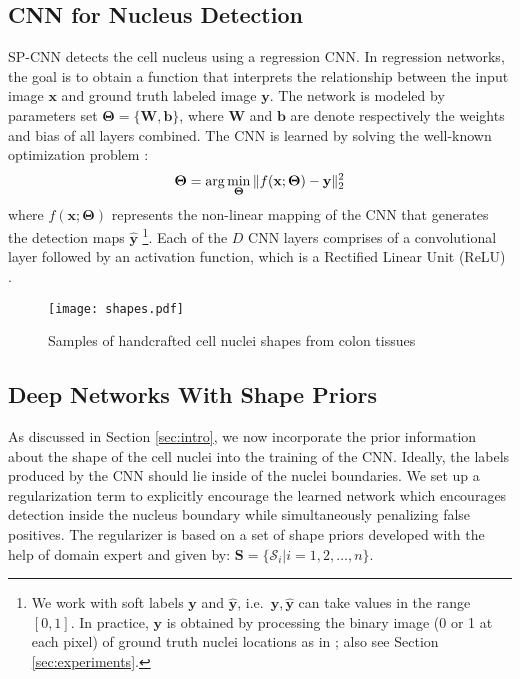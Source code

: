 \documentclass{article}
\begin{document}
\subsection{CNN for Nucleus Detection}\vspace{-3pt}
SP-CNN detects the cell nucleus using a regression CNN. In regression networks, the goal is to obtain a function that interprets the relationship between the input image $\mathbf{x}$ and ground truth labeled image $\mathbf{y}$. The network is modeled by parameters set $\mathbf{\Theta}=\{\mathbf{W}, \mathbf{b}\}$, where $\mathbf{W}$ and $\mathbf{b}$ are denote respectively the weights and bias of all layers combined. The CNN is learned by solving the well-known optimization problem \cite{SC_CNN,RegFuncRef1,RegFuncRef2}:\vspace{-2mm}
\begin{equation}
\mathbf{\Theta} = \arg\min\limits_{\mathbf{\Theta}}\|f(\mathbf{x}; \mathbf{\Theta}) - \mathbf{y}\|_2^2
\label{eq:CNN_func}\vspace{-2mm}
\end{equation}
where $f(\mathbf{x;\Theta})$ represents the non-linear mapping of the CNN that generates the detection maps $\mathbf{\hat{y}}$ \footnote{\noindent We work with soft labels $\mathbf{y}$ and $\mathbf{\hat{y}}$, i.e.\ $\mathbf{y}, \mathbf{\hat{y}}$ can take values in the range $[0,1]$. In practice, $\mathbf{y}$ is obtained by processing the binary image (0 or 1 at each pixel) of ground truth nuclei locations as in \cite{SC_CNN}; also see Section \ref{sec:experiments}.}. Each of the $D$ CNN layers comprises of a convolutional layer followed by an activation function, which is a Rectified Linear Unit (ReLU) \cite{relu}.

\begin{figure}
	\begin{center}
	\vspace{-4pt}
		\texttt{[image: shapes.pdf]}\vspace{-5pt}
		\caption{\ninept Samples of handcrafted cell nuclei shapes from colon tissues}
		\label{fig:shapes}
	\end{center}\vspace{-25pt}
\end{figure}

\subsection{Deep Networks With Shape Priors}\vspace{-2mm}
As discussed in Section \ref{sec:intro}, we now incorporate the prior information about the shape of the cell nuclei into the training of the CNN. Ideally, the labels produced by the CNN should lie inside of the nuclei boundaries. We set up a regularization term to explicitly encourage the learned network which encourages detection inside the nucleus boundary while simultaneously penalizing false positives. The regularizer is based on a set of shape priors developed with the help of domain expert and given by:
$\mathbf{S} = \{\mathcal{S}_i | i = 1, 2, \dots, n\}$.
\end{document}
